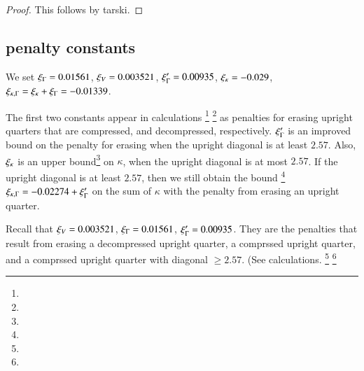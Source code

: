 \begin{proof}
This follows by tarski.
\end{proof}


\subsection{penalty constants}

\begin{definition}
We set $\xi_\Gamma = 0.01561$, $\xi_V = 0.003521$, $\xi_\Gamma'=0.00935$,
$\xi_\kappa=-0.029$, $\xi_{\kappa,\Gamma} = \xi_\kappa+\xi_\Gamma = -0.01339$.
\end{definition}

The first two constants appear in calculations%
\footnote{} %
\footnote{} %
as penalties for erasing upright quarters that are compressed, and
decompressed, respectively. $\xi_\Gamma'$ is an improved bound on the
penalty for erasing when the upright diagonal is at least $2.57$.
Also, $\xi_\kappa$ is an upper bound\footnote{} %
 on $\kappa$, when the
upright diagonal is at most $2.57$.  If the upright diagonal is at
least $2.57$, then we still obtain the bound%
\footnote{} %
$\xi_{\kappa,\Gamma} =-0.02274+\xi_\Gamma'$ on the sum of $\kappa$ with the
penalty from erasing an upright quarter.

Recall that $\xi_V=0.003521$, $\xi_\Gamma=0.01561$, $\xi_\Gamma'=0.00935$. They are
the penalties that result from erasing a 
decompressed upright quarter, a comprssed upright quarter, 
and a comprssed upright quarter
with diagonal $\ge2.57$. (See calculations.%
\footnote{} %
\footnote{} %


